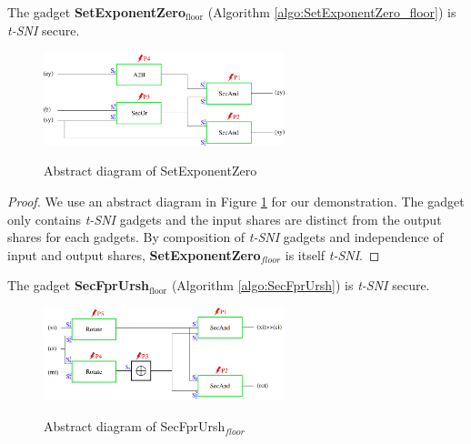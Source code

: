\documentclass[runningheads]{llncs}
\begin{document}
\begin{lemma}
  The gadget \textbf{SetExponentZero$_\text{floor}$} (Algorithm \ref{algo:SetExponentZero_floor}) is \emph{t-SNI} secure.
\end{lemma}
\begin{figure}[!ht]
  \centering
  \includegraphics[width=7cm]{figure/SetExZero2.pdf}
  \label{fig:SetExponentZero}
  \caption{Abstract diagram of SetExponentZero}
\end{figure}
\begin{proof}
  We use an abstract diagram in Figure \ref{fig:SetExponentZero} for our demonstration. The gadget only contains \emph{t-SNI} gadgets and the input shares are distinct from the output shares for each gadgets. By composition of \emph{t-SNI} gadgets and independence of input and output shares, \textbf{SetExponentZero$_{floor}$} is itself \emph{t-SNI}.
\end{proof}

\begin{lemma}
  The gadget \textbf{SecFprUrsh$_\text{floor}$} (Algorithm \ref{algo:SecFprUrsh}) is \emph{t-SNI} secure.
\end{lemma}

\begin{figure}[!ht]
  \centering
  \includegraphics[width=7cm]{figure/secfprurshmod.png}
  \label{fig:Secfprurshmod}
  \caption{Abstract diagram of SecFprUrsh$_{floor}$}
\end{figure}
\end{document}
